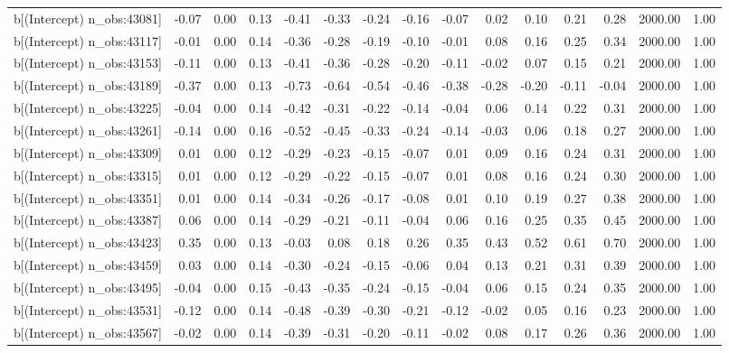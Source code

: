 \begin{table}[ht]
\begin{tabular}{rrrrrrrrrrrrrrr}
  b[(Intercept) n\_obs:43081] & -0.07 & 0.00 & 0.13 & -0.41 & -0.33 & -0.24 & -0.16 & -0.07 & 0.02 & 0.10 & 0.21 & 0.28 & 2000.00 & 1.00 \\ 
  b[(Intercept) n\_obs:43117] & -0.01 & 0.00 & 0.14 & -0.36 & -0.28 & -0.19 & -0.10 & -0.01 & 0.08 & 0.16 & 0.25 & 0.34 & 2000.00 & 1.00 \\ 
  b[(Intercept) n\_obs:43153] & -0.11 & 0.00 & 0.13 & -0.41 & -0.36 & -0.28 & -0.20 & -0.11 & -0.02 & 0.07 & 0.15 & 0.21 & 2000.00 & 1.00 \\ 
  b[(Intercept) n\_obs:43189] & -0.37 & 0.00 & 0.13 & -0.73 & -0.64 & -0.54 & -0.46 & -0.38 & -0.28 & -0.20 & -0.11 & -0.04 & 2000.00 & 1.00 \\ 
  b[(Intercept) n\_obs:43225] & -0.04 & 0.00 & 0.14 & -0.42 & -0.31 & -0.22 & -0.14 & -0.04 & 0.06 & 0.14 & 0.22 & 0.31 & 2000.00 & 1.00 \\ 
  b[(Intercept) n\_obs:43261] & -0.14 & 0.00 & 0.16 & -0.52 & -0.45 & -0.33 & -0.24 & -0.14 & -0.03 & 0.06 & 0.18 & 0.27 & 2000.00 & 1.00 \\ 
  b[(Intercept) n\_obs:43309] & 0.01 & 0.00 & 0.12 & -0.29 & -0.23 & -0.15 & -0.07 & 0.01 & 0.09 & 0.16 & 0.24 & 0.31 & 2000.00 & 1.00 \\ 
  b[(Intercept) n\_obs:43315] & 0.01 & 0.00 & 0.12 & -0.29 & -0.22 & -0.15 & -0.07 & 0.01 & 0.08 & 0.16 & 0.24 & 0.30 & 2000.00 & 1.00 \\ 
  b[(Intercept) n\_obs:43351] & 0.01 & 0.00 & 0.14 & -0.34 & -0.26 & -0.17 & -0.08 & 0.01 & 0.10 & 0.19 & 0.27 & 0.38 & 2000.00 & 1.00 \\ 
  b[(Intercept) n\_obs:43387] & 0.06 & 0.00 & 0.14 & -0.29 & -0.21 & -0.11 & -0.04 & 0.06 & 0.16 & 0.25 & 0.35 & 0.45 & 2000.00 & 1.00 \\ 
  b[(Intercept) n\_obs:43423] & 0.35 & 0.00 & 0.13 & -0.03 & 0.08 & 0.18 & 0.26 & 0.35 & 0.43 & 0.52 & 0.61 & 0.70 & 2000.00 & 1.00 \\ 
  b[(Intercept) n\_obs:43459] & 0.03 & 0.00 & 0.14 & -0.30 & -0.24 & -0.15 & -0.06 & 0.04 & 0.13 & 0.21 & 0.31 & 0.39 & 2000.00 & 1.00 \\ 
  b[(Intercept) n\_obs:43495] & -0.04 & 0.00 & 0.15 & -0.43 & -0.35 & -0.24 & -0.15 & -0.04 & 0.06 & 0.15 & 0.24 & 0.35 & 2000.00 & 1.00 \\ 
  b[(Intercept) n\_obs:43531] & -0.12 & 0.00 & 0.14 & -0.48 & -0.39 & -0.30 & -0.21 & -0.12 & -0.02 & 0.05 & 0.16 & 0.23 & 2000.00 & 1.00 \\ 
  b[(Intercept) n\_obs:43567] & -0.02 & 0.00 & 0.14 & -0.39 & -0.31 & -0.20 & -0.11 & -0.02 & 0.08 & 0.17 & 0.26 & 0.36 & 2000.00 & 1.00 \\ 

\end{tabular}
\end{table}
